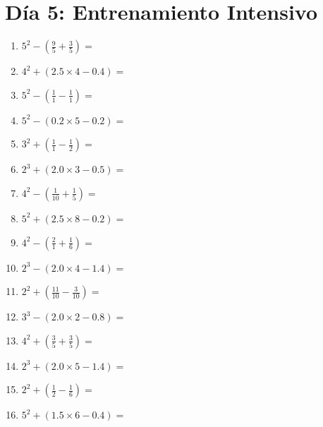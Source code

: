 \documentclass[12pt]{article}
\begin{document}
\section*{Día 5: Entrenamiento Intensivo}
\begin{enumerate}
\item \large $ 5^{2} - (\frac{9}{5} + \frac{3}{5}) = $ \vspace{1.6cm}
\item \large $ 4^{2} + (2.5 \times 4 - 0.4) = $ \vspace{1.6cm}
\item \large $ 5^{2} - (\frac{1}{1} - \frac{1}{1}) = $ \vspace{1.6cm}
\item \large $ 5^{2} - (0.2 \times 5 - 0.2) = $ \vspace{1.6cm}
\item \large $ 3^{2} + (\frac{1}{1} - \frac{1}{2}) = $ \vspace{1.6cm}
\item \large $ 2^{3} + (2.0 \times 3 - 0.5) = $ \vspace{1.6cm}
\item \large $ 4^{2} - (\frac{1}{10} + \frac{1}{5}) = $ \vspace{1.6cm}
\item \large $ 5^{2} + (2.5 \times 8 - 0.2) = $ \vspace{1.6cm}
\item \large $ 4^{2} - (\frac{2}{1} + \frac{1}{6}) = $ \vspace{1.6cm}
\item \large $ 2^{3} - (2.0 \times 4 - 1.4) = $ \vspace{1.6cm}
\newpage
\item \large $ 2^{2} + (\frac{11}{10} - \frac{3}{10}) = $ \vspace{1.6cm}
\item \large $ 3^{3} - (2.0 \times 2 - 0.8) = $ \vspace{1.6cm}
\item \large $ 4^{2} + (\frac{3}{5} + \frac{3}{5}) = $ \vspace{1.6cm}
\item \large $ 2^{3} + (2.0 \times 5 - 1.4) = $ \vspace{1.6cm}
\item \large $ 2^{2} + (\frac{1}{2} - \frac{1}{6}) = $ \vspace{1.6cm}
\item \large $ 5^{2} + (1.5 \times 6 - 0.4) = $ \vspace{1.6cm}

\end{enumerate}
\end{document}
